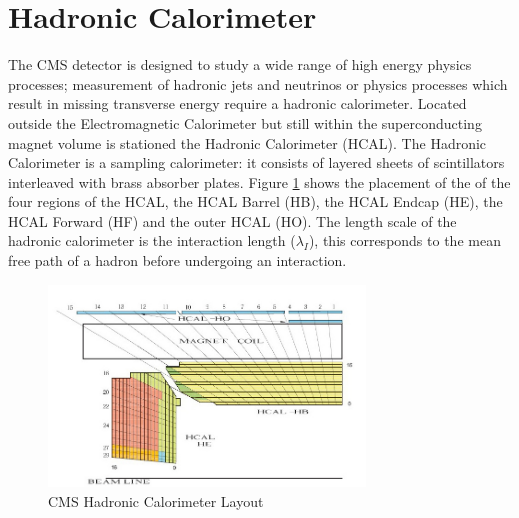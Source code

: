 \section{Hadronic Calorimeter}
The CMS detector is designed to study a wide range of high energy 
physics processes; measurement of hadronic jets and neutrinos or
physics processes which result in missing transverse energy require
a hadronic calorimeter. 
Located outside the Electromagnetic Calorimeter but still within the
superconducting magnet volume is stationed the Hadronic Calorimeter (HCAL).
The Hadronic Calorimeter is a sampling calorimeter: it consists of layered 
sheets of scintillators interleaved with brass absorber plates. 
Figure \ref{fig:HCALLayout}
shows the placement of the of the four regions of the HCAL, the HCAL Barrel (HB),
the HCAL Endcap (HE), the HCAL Forward (HF) and the outer HCAL (HO). 
The length scale of the hadronic calorimeter is the interaction length ($\lambda_{I}$),
this corresponds to the mean free path of a hadron before undergoing
an interaction. 
\begin{figure}[hb]
  \centering
	\includegraphics[width=0.75\textwidth]{images/HCAL.jpg}
  	\caption[HCAL Layout]
   	{CMS Hadronic Calorimeter Layout}
	\label{fig:HCALLayout}
\end{figure}

